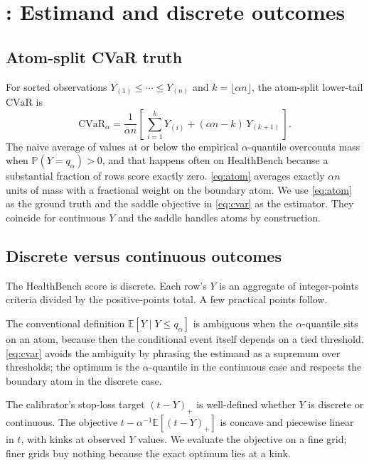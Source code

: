 \documentclass[11pt]{article}
\newcommand{\E}{\mathbb{E}}
\newcommand{\Prob}{\mathbb{P}}
\newcommand{\CVaR}{\mathrm{CVaR}}
\renewcommand{\thefootnote}{\fnsymbol{footnote}}
\begin{document}
\appendix
\renewcommand{\thesection}{Appendix \Alph{section}}
\renewcommand{\thefootnote}{\arabic{footnote}}
\setcounter{footnote}{0}

\section{: Estimand and discrete outcomes}
\label{app:estimand}

\subsection{Atom-split CVaR truth}
\label{app:atom}

For sorted observations $Y_{(1)} \le \cdots \le Y_{(n)}$ and $k =
\lfloor \alpha n \rfloor$, the atom-split lower-tail $\CVaR$ is
\begin{equation}
\CVaR_\alpha = \frac{1}{\alpha n}\left[\,
\sum_{i=1}^{k} Y_{(i)} + (\alpha n - k)\, Y_{(k+1)} \,\right].
\label{eq:atom}
\end{equation}
The naive average of values at or below the empirical $\alpha$-quantile
overcounts mass when $\Prob(Y = q_\alpha) > 0$, and that happens often
on HealthBench because a substantial fraction of rows score exactly
zero. \eqref{eq:atom} averages exactly $\alpha n$ units of mass with a
fractional weight on the boundary atom. We use \eqref{eq:atom} as the
ground truth and the saddle objective in \eqref{eq:cvar} as the
estimator. They coincide for continuous $Y$ and the saddle handles
atoms by construction.

\subsection{Discrete versus continuous outcomes}
\label{app:discrete}

The HealthBench score is discrete. Each row's $Y$ is an aggregate of
integer-points criteria divided by the positive-points total. A few
practical points follow.

The conventional definition $\E[Y \mid Y \le q_\alpha]$ is ambiguous
when the $\alpha$-quantile sits on an atom, because then the conditional
event itself depends on a tied threshold. \eqref{eq:cvar} avoids the
ambiguity by phrasing the estimand as a supremum over thresholds; the
optimum is the $\alpha$-quantile in the continuous case and respects
the boundary atom in the discrete case.

The calibrator's stop-loss target $(t - Y)_+$ is well-defined whether
$Y$ is discrete or continuous. The objective $t - \alpha^{-1}\E[(t -
Y)_+]$ is concave and piecewise linear in $t$, with kinks at observed
$Y$ values. We evaluate the objective on a fine grid; finer grids buy
nothing because the exact optimum lies at a kink.
\end{document}
